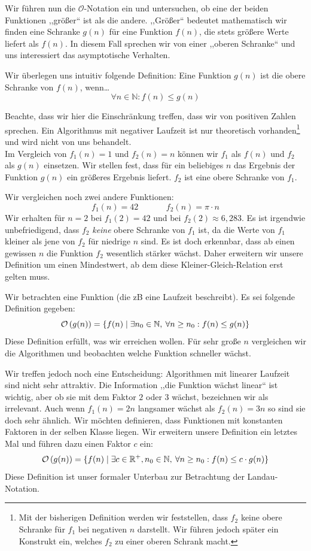 Wir führen nun die $\mathcal{O}$-Notation ein und untersuchen, ob eine der beiden Funktionen ,,größer`` ist als die andere. ,,Größer`` bedeutet mathematisch wir finden eine Schranke $g(n)$ für eine Funktion $f(n)$, die stets größere Werte liefert als $f(n)$. In diesem Fall sprechen wir von einer ,,oberen Schranke`` und uns interessiert das asymptotische Verhalten.

Wir überlegen uns intuitiv folgende Definition: Eine Funktion $g(n)$ ist die obere Schranke von $f(n)$, wenn\dots
\[
  \forall n \in \mathbb{N}: f(n) \leq g(n)
\]

Beachte, dass wir hier die Einschränkung treffen, dass wir von positiven Zahlen sprechen. Ein Algorithmus mit negativer Laufzeit ist nur theoretisch vorhanden\footnote{Mit der bisherigen Definition werden wir feststellen, dass $f_2$ keine obere Schranke für $f_1$ bei negativen $n$ darstellt. Wir führen jedoch später ein Konstrukt ein, welches $f_2$ zu einer oberen Schrank macht.} und wird nicht von uns behandelt. \\
Im Vergleich von $f_1(n) = 1$ und $f_2(n) = n$ können wir $f_1$ als $f(n)$ und $f_2$ als $g(n)$ einsetzen. Wir stellen fest, dass für ein beliebiges $n$ das Ergebnis der Funktion $g(n)$ ein größeres Ergebnis liefert. $f_2$ ist eine obere Schranke von $f_1$.

Wir vergleichen noch zwei andere Funktionen:
\[
   f_1(n) = 42   \hspace{40pt}  f_2(n) = \pi \cdot n
\]
Wir erhalten für $n = 2$ bei $f_1(2) = 42$ und bei $f_2(2) \approx 6,283$. Es ist irgendwie unbefriedigend, dass $f_2$ \emph{keine} obere Schranke von $f_1$ ist, da die Werte von $f_1$ kleiner als jene von $f_2$ für niedrige $n$ sind. Es ist doch erkennbar, dass ab einen gewissen $n$ die Funktion $f_2$ wesentlich stärker wächst. Daher erweitern wir unsere Definition um einen Mindestwert, ab dem diese Kleiner-Gleich-Relation erst gelten muss.

Wir betrachten eine Funktion (die zB eine Laufzeit beschreibt). Es sei folgende Definition gegeben:
\[
  \mathcal{O}\left(g(n)\right) = \{ f(n) \mid \exists n_0 \in \mathbb{N}, \:\forall n \geq n_0: f(n) \leq g(n) \}
\]
Diese Definition erfüllt, was wir erreichen wollen. Für sehr große $n$ vergleichen wir die Algorithmen und beobachten welche Funktion schneller wächst.

Wir treffen jedoch noch eine Entscheidung: Algorithmen mit linearer Laufzeit sind nicht sehr attraktiv. Die Information ,,die Funktion wächst linear`` ist wichtig, aber ob sie mit dem Faktor $2$ oder $3$ wächst, bezeichnen wir als irrelevant. Auch wenn $f_1(n) = 2n$ langsamer wächst als $f_2(n) = 3n$ so sind sie doch sehr ähnlich. Wir möchten definieren, dass Funktionen mit konstanten Faktoren in der selben Klasse liegen. Wir erweitern unsere Definition ein letztes Mal und führen dazu einen Faktor $c$ ein:
\[
   \mathcal{O}\left(g(n)\right) = \{ f(n) \mid \exists c \in \mathbb{R}^+, n_0 \in \mathbb{N},
                  \:\forall n \geq n_0: f(n) \leq c \cdot g(n) \}
\]
%
Diese Definition ist unser formaler Unterbau zur Betrachtung der Landau-Notation.

